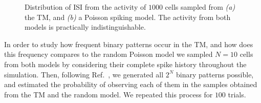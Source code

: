 \documentclass[11pt,letterpaper]{article}
\begin{document}
		    \begin{figure}[t]
			    \centering
			    \caption{
			        Distribution of ISI from the activity of $1000$ cells 
			        sampled from \emph{(a)} the TM, and \emph{(b)} a Poisson spiking model.
			        The activity from both models is practically indistinguishable.
			    }
			    \label{fig14}
		    \end{figure}
            
            In order to study how frequent binary patterns occur in the TM, 
            and how does this frequency compares to
            the random Poisson model we sampled $N = 10$ cells from both models by considering their complete spike
            history throughout the simulation.
            Then, following Ref.~\cite{schneidman2006weak}, we generated all $2^{N}$ binary patterns possible, and
            estimated the probability of observing each of them in the samples obtained from the TM and the random
            model.
            We repeated this process for $100$ trials.
\end{document}
